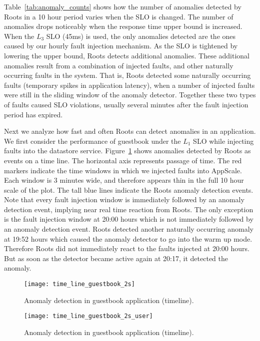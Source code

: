 Table~\ref{tab:anomaly_counts} shows how the number of anomalies detected by 
Roots in a 10 hour period varies when the SLO is changed. The number of anomalies
drops noticeably when the response time upper bound is increased. When the $L_3$
SLO (45ms) is used, the only anomalies detected are the ones
caused by our hourly fault injection mechanism. As the SLO is tightened by lowering the upper bound,
Roots detects additional anomalies. These additional anomalies
result from a combination of injected faults, and other naturally occurring faults
in the system. That is, Roots detected some naturally occurring
faults (temporary spikes in application latency), when a number of injected faults
were still in the sliding window of the anomaly detector. Together these two types of
faults caused SLO violations, usually several minutes after the fault injection period
has expired.

Next we analyze how fast and often Roots can detect anomalies in an application. We
first consider the performance of guestbook under the $L_1$ SLO while 
injecting faults into the datastore service. Figure~\ref{fig:time_line_guestbook_2s} shows
anomalies detected by Roots as events on a time line. The horizontal axis represents 
passage of time. The red markers indicate the time windows in which we injected faults into
AppScale. Each window is 3 minutes wide, and therefore appears thin in the full 10 hour scale
of the plot. The tall blue lines indicate the Roots anomaly detection events.
Note that every fault injection window is immediately followed by an anomaly
detection event, implying near real time reaction from Roots. The only exception is the fault
injection window at 20:00 hours which is not immediately followed by an anomaly 
detection event. Roots detected another naturally occurring anomaly at 19:52 hours
which caused the anomaly detector to go into the warm up mode. Therefore Roots
did not immediately react to the faults injected at 20:00 hours. But as soon as the detector became
active again at 20:17, it detected the anomaly.

\begin{figure}
\centering
\texttt{[image: time\_line\_guestbook\_2s]}
\caption{Anomaly detection in guestbook application (timeline).}
\label{fig:time_line_guestbook_2s}
\end{figure}

\begin{figure}
\centering
\texttt{[image: time\_line\_guestbook\_2s\_user]}
\caption{Anomaly detection in guestbook application (timeline).}
\label{fig:time_line_guestbook_2s_user}
\end{figure}

